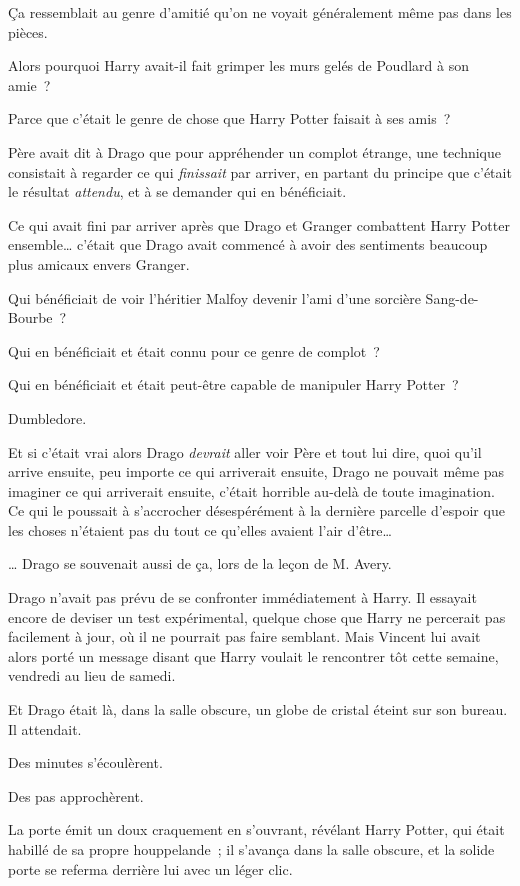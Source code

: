 Ça ressemblait au genre d'amitié qu'on ne voyait généralement même pas dans les pièces.

Alors pourquoi Harry avait-il fait grimper les murs gelés de Poudlard à son amie~?

Parce que c'était le genre de chose que Harry Potter faisait à ses amis~?

Père avait dit à Drago que pour appréhender un complot étrange, une technique consistait à regarder ce qui \emph{finissait} par arriver, en partant du principe que c'était le résultat \emph{attendu}, et à se demander qui en bénéficiait.

Ce qui avait fini par arriver après que Drago et Granger combattent Harry Potter ensemble… c'était que Drago avait commencé à avoir des sentiments beaucoup plus amicaux envers Granger.

Qui bénéficiait de voir l'héritier Malfoy devenir l'ami d'une sorcière Sang-de-Bourbe~?

Qui en bénéficiait et était connu pour ce genre de complot~?

Qui en bénéficiait et était peut-être capable de manipuler Harry Potter~?

Dumbledore.

Et si c'était vrai alors Drago \emph{devrait} aller voir Père et tout lui dire, quoi qu'il arrive ensuite, peu importe ce qui arriverait ensuite, Drago ne pouvait même pas imaginer ce qui arriverait ensuite, c'était horrible au-delà de toute imagination.
Ce qui le poussait à s'accrocher désespérément à la dernière parcelle d'espoir que les choses n'étaient pas du tout ce qu'elles avaient l'air d'être…

… Drago se souvenait aussi de ça, lors de la leçon de M. Avery.

Drago n'avait pas prévu de se confronter immédiatement à Harry.
Il essayait encore de deviser un test expérimental, quelque chose que Harry ne percerait pas facilement à jour, où il ne pourrait pas faire semblant.
Mais Vincent lui avait alors porté un message disant que Harry voulait le rencontrer tôt cette semaine, vendredi au lieu de samedi.

Et Drago était là, dans la salle obscure, un globe de cristal éteint sur son bureau.
Il attendait.

Des minutes s'écoulèrent.

Des pas approchèrent.

La porte émit un doux craquement en s'ouvrant, révélant Harry Potter, qui était habillé de sa propre houppelande~; il s'avança dans la salle obscure, et la solide porte se referma derrière lui avec un léger clic.

